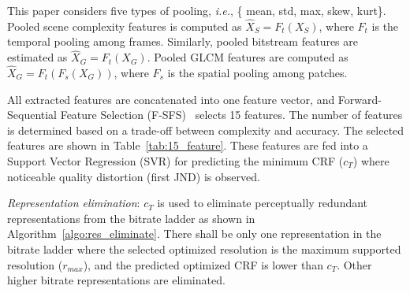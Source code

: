 \documentclass{article}
\newcommand{\ie}{\emph{i.e.}, }
\begin{document}
\vspace{-0.30em}
This paper considers five types of pooling, \ie \{ mean, std, max, skew, kurt\}. Pooled scene complexity features is computed as ${{\hat X}_S}={F_t}({X_S})$, where $F_t$ is the temporal pooling among frames. Similarly, pooled bitstream features are estimated as ${{\hat X}_G}={F_t}({X_G})$. Pooled GLCM features are computed as ${{\hat X}_G}= {F_t}({F_s}({X_G}))$, where $F_s$ is the spatial pooling among patches.

All extracted features are concatenated into one feature vector, and Forward-Sequential Feature Selection (F-SFS)~\cite{ferri1994comparative} selects 15 features. The number of features is determined based on a trade-off between complexity and accuracy. The selected features are shown in Table~\ref{tab:15_feature}. These features are fed into a Support Vector Regression (SVR) for predicting the minimum CRF ($c_T$) where noticeable quality distortion (first JND) is observed.

\textit{Representation elimination}: $c_T$ is used to eliminate perceptually redundant representations from the bitrate ladder as shown in Algorithm~\ref{algo:res_eliminate}. There shall be only one representation in the bitrate ladder where the selected optimized resolution is the maximum supported resolution ($r_{max}$), and the predicted optimized CRF is lower than $c_T$. Other higher bitrate representations are eliminated.
\end{document}
